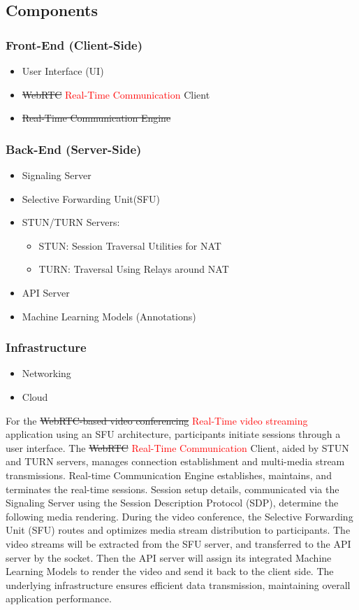 \documentclass[12pt]{article}
\begin{document}
\subsection{Components}
\subsubsection{Front-End (Client-Side)}
\begin{itemize}
    \item User Interface (UI)
    \item \sout{WebRTC} \textcolor{red}{Real-Time Communication} Client
    \item \sout{Real-Time Communication Engine}
\end{itemize}
\subsubsection{Back-End (Server-Side)}
\begin{itemize}
    \item Signaling Server
    \item Selective Forwarding Unit(SFU)
    \item STUN/TURN Servers:
        \begin{itemize}
            \item STUN: Session Traversal Utilities for NAT
            \item TURN: Traversal Using Relays around NAT
        \end{itemize}
    \item API Server
    \item Machine Learning Models (Annotations)
\end{itemize}
\subsubsection{Infrastructure}
\begin{itemize}
    \item Networking
    \item Cloud
\end{itemize}
For the \sout{WebRTC-based video conferencing} \textcolor{red} {Real-Time video streaming} application using an SFU architecture, participants initiate sessions through a user interface. The \sout{WebRTC} \textcolor{red}{Real-Time Communication} Client, aided by STUN and TURN servers, manages connection establishment and multi-media stream transmissions. Real-time Communication Engine establishes, maintains, and terminates the real-time sessions. Session setup details, communicated via the Signaling Server using the Session Description Protocol (SDP), determine the following media rendering. During the video conference, the Selective Forwarding Unit (SFU) routes and optimizes media stream distribution to participants. The video streams will be extracted from the SFU server,  and transferred to the API server by the socket. Then the API server will assign its integrated Machine Learning Models to render the video and send it back to the client side. The underlying infrastructure ensures efficient data transmission, maintaining overall application performance.
\end{document}
